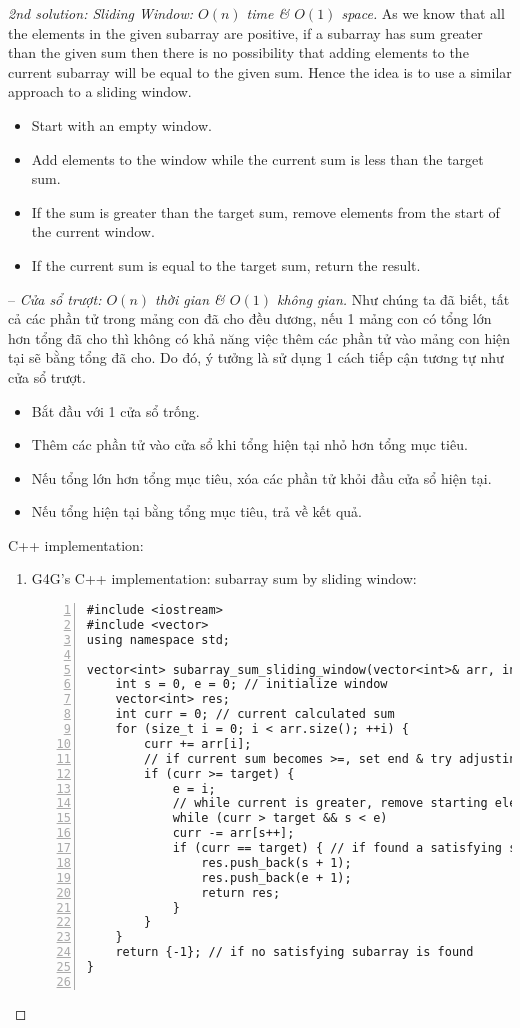 \documentclass{article}
\begin{document}
\begin{proof}[2nd solution: Sliding Window: $O(n)$ time \& $O(1)$ space]
    As we know that all the elements in the given subarray are positive, if a subarray has sum greater than the given sum then there is no possibility that adding elements to the current subarray will be equal to the given sum. Hence the idea is to use a similar approach to a sliding window.
    \begin{itemize}
        \item Start with an empty window.
        \item Add elements to the window while the current sum is less than the target sum.
        \item If the sum is greater than the target sum, remove elements from the start of the current window.
        \item If the current sum is equal to the target sum, return the result.
    \end{itemize}
    -- {\it Cửa sổ trượt: $O(n)$ thời gian \& $O(1)$ không gian.} Như chúng ta đã biết, tất cả các phần tử trong mảng con đã cho đều dương, nếu 1 mảng con có tổng lớn hơn tổng đã cho thì không có khả năng việc thêm các phần tử vào mảng con hiện tại sẽ bằng tổng đã cho. Do đó, ý tưởng là sử dụng 1 cách tiếp cận tương tự như cửa sổ trượt.
    \begin{itemize}
        \item Bắt đầu với 1 cửa sổ trống.
        \item Thêm các phần tử vào cửa sổ khi tổng hiện tại nhỏ hơn tổng mục tiêu.
        \item Nếu tổng lớn hơn tổng mục tiêu, xóa các phần tử khỏi đầu cửa sổ hiện tại.
        \item Nếu tổng hiện tại bằng tổng mục tiêu, trả về kết quả.
    \end{itemize}
    C++ implementation:
    \begin{enumerate}
        \item G4G's C++ implementation: subarray sum by sliding window:
        \begin{Verbatim}[numbers=left,xleftmargin=5mm]
#include <iostream>
#include <vector>
using namespace std;

vector<int> subarray_sum_sliding_window(vector<int>& arr, int target) {
    int s = 0, e = 0; // initialize window
    vector<int> res;
    int curr = 0; // current calculated sum
    for (size_t i = 0; i < arr.size(); ++i) {
        curr += arr[i];
        // if current sum becomes >=, set end & try adjusting start
        if (curr >= target) {
            e = i;
            // while current is greater, remove starting elements of current window
            while (curr > target && s < e)
            curr -= arr[s++];
            if (curr == target) { // if found a satisfying subarray
                res.push_back(s + 1);
                res.push_back(e + 1);
                return res;
            }
        }
    }
    return {-1}; // if no satisfying subarray is found
}


\end{Verbatim}
\end{enumerate}
\end{proof}
\end{document}
